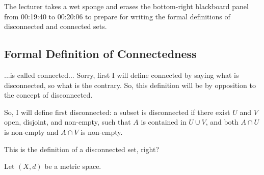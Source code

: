 \begin{note}
The lecturer takes a wet sponge and erases the bottom-right blackboard panel from 00:19:40 to 00:20:06 to prepare for writing the formal definitions of disconnected and connected sets.
\end{note}

\subsection{Formal Definition of Connectedness}

\begin{speech}[01:22:15 - 01:24:03]
...is called connected...  Sorry, first I will define connected by saying what is disconnected, so what is the contrary. So, this definition will be by opposition to the concept of disconnected.

So, I will define first disconnected:  a subset is disconnected if there exist $U$ and $V$ open,  disjoint,  and non-empty,  such that $A$ is contained in $U \cup V$,  and both $A \cap U$ is non-empty  and $A \cap V$ is non-empty. 

This is the definition of a disconnected set, right?
\end{speech}

\begin{content}
Let $(X, d)$ be a metric space.

\end{content}

